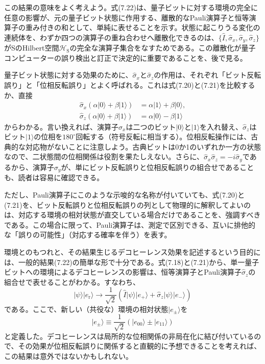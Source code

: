 この結果の意味をよく考えよう。式(7.22)は、量子ビットに対する環境の完全に任意の影響が、元の量子ビット状態に作用する、離散的なPauli演算子と恒等演算子の重み付きの和として、単純に表せることを示す。状態に起こりうる変化の連続体を、わずか四つの演算子の重ね合わせへ離散化できるのは、$\{\hat I,\hat\sigma_x,\hat\sigma_y,\hat\sigma_z\}$がSのHilbert空間$\mathcal H_{\mathrm S}$の完全な演算子集合をなすためである。この離散化が量子コンピューターの誤り検出と訂正で決定的に重要であることを、後で見る。

量子ビット状態に対する効果のために、$\hat\sigma_x$と$\hat\sigma_z$の作用は、それぞれ「ビット反転誤り」と「位相反転誤り」とよく呼ばれる。これは式(7.20)と(7.21)を比較するか、直接
\begin{align}\hat\sigma_x(\alpha|0\rangle+\beta|1\rangle)&=\alpha|1\rangle+\beta|0\rangle,\tag{7.23a}\\\hat\sigma_z(\alpha|0\rangle+\beta|1\rangle)&=\alpha|0\rangle-\beta|1\rangle\tag{7.23b}\end{align}
からわかる。言い換えれば、演算子$\hat\sigma_x$は二つのビット$|0\rangle$と$|1\rangle$を入れ替え、$\hat\sigma_z$はビット$|1\rangle$の位相を$180^\circ$回転する（符号反転に相当する）。位相反転操作には、古典的な対応物がないことに注意しよう。古典ビットは0か1のいずれか一方の状態なので、二状態間の位相関係は役割を果たしえない。さらに、$\hat\sigma_x\hat\sigma_z=-i\hat\sigma_y$であるから、演算子$\hat\sigma_y$が、単にビット反転誤りと位相反転誤りの組合せであることも、読者は容易に確認できる。

ただし、Pauli演算子にこのような示唆的な名称が付いていても、式(7.20)と(7.21)を、ビット反転誤りと位相反転誤りの列として物理的に解釈してよいのは、対応する環境の相対状態が直交している場合だけであることを、強調すべきである。この場合に限って、Pauli演算子は、測定で区別できる、互いに排他的な「誤りの可能性」（対応する確率を伴う）を表す。

環境とのもつれと、その結果生じるデコヒーレンス効果を記述するという目的には、一般的結果(7.22)の簡単な形で十分である。式(7.18)と(7.21)から、単一量子ビットへの環境によるデコヒーレンスの影響は、恒等演算子とPauli演算子$\hat\sigma_z$の組合せで表せることがわかる。すなわち、
\begin{equation}|\psi\rangle|e_{\mathrm r}\rangle\longrightarrow\frac1{\sqrt2}(\hat I|\psi\rangle|e_+\rangle+\hat\sigma_z|\psi\rangle|e_-\rangle)\tag{7.24}\end{equation}
である。ここで、新しい（共役な）環境の相対状態$|e_\pm\rangle$を
\begin{equation}|e_\pm\rangle\equiv\frac1{\sqrt2}(|e_{00}\rangle\pm|e_{11}\rangle)\tag{7.25}\end{equation}
と定義した。デコヒーレンスは局所的な位相関係の非局在化に結び付いているので、その効果が位相反転誤りに関係すると直観的に予想できることを考えれば、この結果は意外ではないかもしれない。

